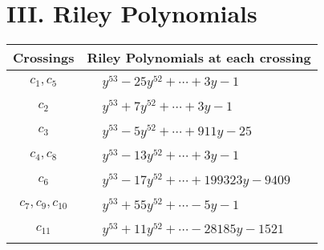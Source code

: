 \documentclass[1p]{elsarticle_modified}
\theoremstyle{definition}
\begin{document}
\centering \section*{ III. Riley Polynomials}
\begin{tabular}{m{50pt}|m{274pt}}
Crossings & \hspace{64pt}Riley Polynomials at each crossing \\
\hline $$\begin{aligned}c_{1},c_{5}\end{aligned}$$&$\begin{aligned}
&y^{53}-25 y^{52}+\cdots+3 y-1
\end{aligned}$\\
\hline $$\begin{aligned}c_{2}\end{aligned}$$&$\begin{aligned}
&y^{53}+7 y^{52}+\cdots+3 y-1
\end{aligned}$\\
\hline $$\begin{aligned}c_{3}\end{aligned}$$&$\begin{aligned}
&y^{53}-5 y^{52}+\cdots+911 y-25
\end{aligned}$\\
\hline $$\begin{aligned}c_{4},c_{8}\end{aligned}$$&$\begin{aligned}
&y^{53}-13 y^{52}+\cdots+3 y-1
\end{aligned}$\\
\hline $$\begin{aligned}c_{6}\end{aligned}$$&$\begin{aligned}
&y^{53}-17 y^{52}+\cdots+199323 y-9409
\end{aligned}$\\
\hline $$\begin{aligned}c_{7},c_{9},c_{10}\end{aligned}$$&$\begin{aligned}
&y^{53}+55 y^{52}+\cdots-5 y-1
\end{aligned}$\\
\hline $$\begin{aligned}c_{11}\end{aligned}$$&$\begin{aligned}
&y^{53}+11 y^{52}+\cdots-28185 y-1521
\end{aligned}$\\
\hline
\end{tabular}
\vskip 2pc
\end{document}
